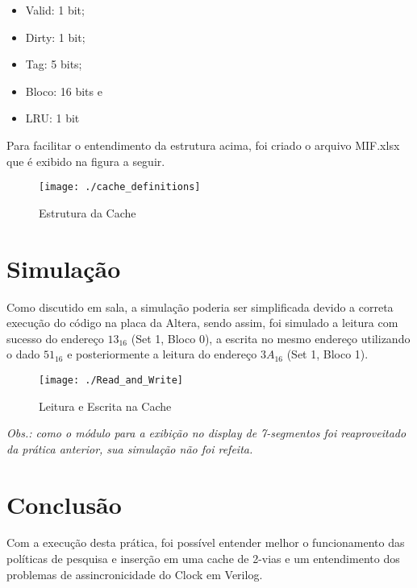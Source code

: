 \documentclass[12pt, a4paper]{article}
\begin{document}
	\vspace{\baselineskip}
	
	\begin{itemize}
		\item Valid: 1 bit;
		\item Dirty: 1 bit;
		\item Tag: 5 bits;
		\item Bloco: 16 bits e
		\item LRU: 1 bit
	\end{itemize}
    
    \vspace{\baselineskip}
    
    \par Para facilitar o entendimento da estrutura acima, foi criado o arquivo MIF.xlsx que é exibido na figura a seguir.
    
    \vspace{\baselineskip}
    
    \begin{figure}[H]
    	\centering
    	\texttt{[image: ./cache\_definitions]}
    	\caption{Estrutura da Cache}
    	\label{fig: cache definitios}
    \end{figure}
    
	\section{Simulação}
	
	\par Como discutido em sala, a simulação poderia ser simplificada devido a correta execução do código na placa da Altera, sendo assim, foi simulado a leitura com sucesso do endereço $13_{16}$ (Set 1, Bloco 0), a escrita no mesmo endereço utilizando o dado $51_{16}$ e posteriormente a leitura do endereço $3A_{16}$ (Set 1, Bloco 1).
	
	\begin{figure}[H]
		\centering
		\texttt{[image: ./Read\_and\_Write]}
		\caption{Leitura e Escrita na Cache}
		\label{fig: Read and Write}
	\end{figure}
    
	\vspace{\baselineskip}
	
	\par \textit{Obs.: como o módulo para a exibição no display de 7-segmentos foi reaproveitado da prática anterior, sua simulação não foi refeita.}

	\section{Conclusão}
	
	\par Com a execução desta prática, foi possível entender melhor o funcionamento das políticas de pesquisa e inserção em uma cache de 2-vias e um entendimento dos problemas de assincronicidade do Clock em Verilog.
\end{document}
